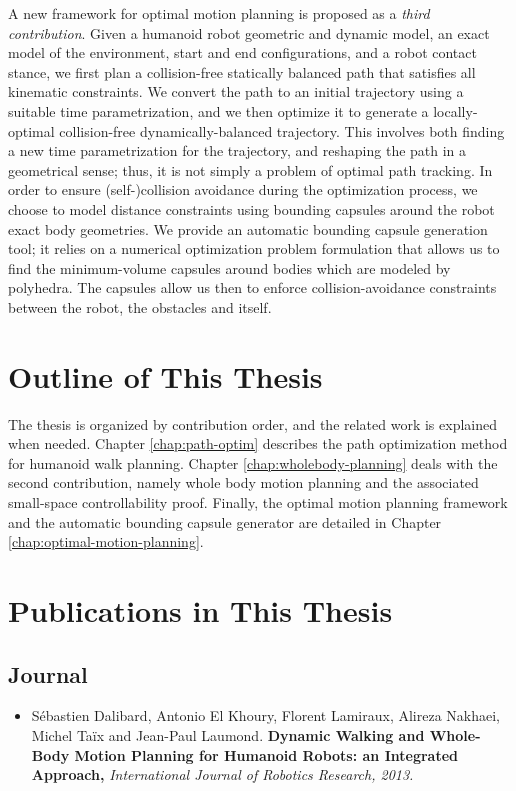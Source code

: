 A new framework for optimal motion planning is proposed as a
\emph{third contribution}. Given a humanoid robot geometric and
dynamic model, an exact model of the environment, start and end
configurations, and a robot contact stance, we first plan a
collision-free statically balanced path that satisfies all kinematic
constraints. We convert the path to an initial trajectory using a
suitable time parametrization, and we then optimize it to generate a
locally-optimal collision-free dynamically-balanced trajectory. This
involves both finding a new time parametrization for the trajectory,
and reshaping the path in a geometrical sense; thus, it is not simply
a problem of optimal path tracking. In order to ensure
(self-)collision avoidance during the optimization process, we choose
to model distance constraints using bounding capsules around the robot
exact body geometries. We provide an automatic bounding capsule
generation tool; it relies on a numerical optimization problem
formulation that allows us to find the minimum-volume capsules around
bodies which are modeled by polyhedra. The capsules allow us then to
enforce collision-avoidance constraints between the robot, the
obstacles and itself.

\section*{Outline of This Thesis}

The thesis is organized by contribution order, and the related work is
explained when needed. Chapter \ref{chap:path-optim} describes the
path optimization method for humanoid walk planning. Chapter
\ref{chap:wholebody-planning} deals with the second contribution,
namely whole body motion planning and the associated small-space
controllability proof. Finally, the optimal motion planning framework
and the automatic bounding capsule generator are detailed in Chapter
\ref{chap:optimal-motion-planning}.

\section*{Publications in This Thesis}

\subsection*{Journal}

\begin{itemize}
\item S\'ebastien Dalibard, Antonio El Khoury, Florent Lamiraux,
  Alireza Nakhaei, Michel Ta\"ix and Jean-Paul
  Laumond. \textbf{Dynamic Walking and Whole-Body Motion Planning for
    Humanoid Robots: an Integrated Approach,} \textit{International
    Journal of Robotics Research, 2013.}
\end{itemize}

